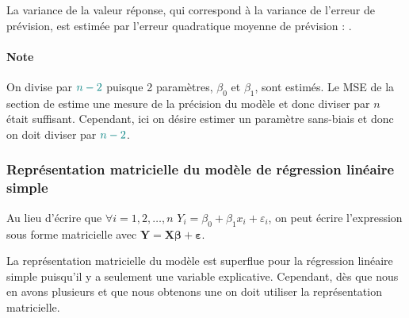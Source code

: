 \documentclass[french]{article}
\begin{document}
\begin{multicols*}{2}
La variance de la valeur réponse, qui correspond à la variance de l'erreur de prévision, est estimée par l'erreur quadratique moyenne de prévision : . 
	
\paragraph{Note}	On divise par $\textcolor{teal}{n - 2}$ puisque 2 paramètres, $\beta_{0}$ et $\beta_{1}$, sont estimés. Le MSE de la section de \textit{\underline{}} estime une mesure de la précision du modèle et donc diviser par $n$ était suffisant. Cependant, ici on désire estimer un paramètre sans-biais et donc on doit diviser par $\textcolor{teal}{n - 2}$.



\subsubsection{Représentation matricielle du modèle de régression linéaire simple}
\begin{rappel_enhanced}[Contexte]
Au lieu d'écrire que $\forall i = 1, 2, \dots, n$ $Y_{i} = \beta_{0} + \beta_{1}x_{i} + \varepsilon_{i}$, on peut écrire l'expression sous forme matricielle avec $\bm{Y} = \bm{X} \bm{\beta} + \bm{\varepsilon}$.

\bigskip

La représentation matricielle du modèle est superflue pour la régression linéaire simple puisqu'il y a seulement une variable explicative. Cependant, dès que nous en avons plusieurs et que nous obtenons une \textit{\underline{}} on doit utiliser la représentation matricielle.
\end{rappel_enhanced}



\end{multicols*}
\end{document}
